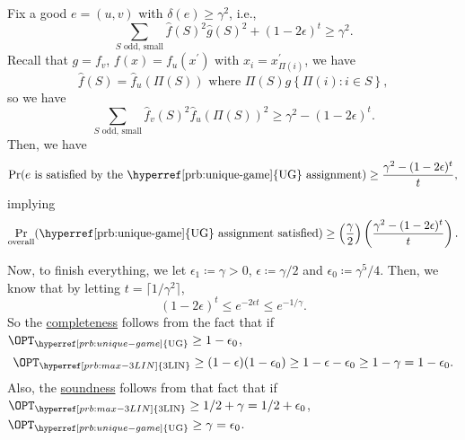 Fix a good \(e=(u, v)\) with \(\delta (e) \geq \gamma ^{2}\), i.e.,
\[
	\sum_{\text{\(S\) odd, small}} \hat{f} (S)^{2} \hat{g} (S)^{2} + (1-2\epsilon )^t \geq \gamma ^2.
\]
Recall that \(g = f_v\), \(f(x) = f_u(x^\prime )\) with \(x_i = x^\prime _{\Pi (i)}\), we have
\[
	\hat{f} (S) = \hat{f} _u(\Pi (S)) \text{ where } \Pi (S) g \left\{ \Pi (i)\colon i\in S \right\},
\]
so we have
\[
	\sum_{\text{\(S\) odd, small}} \hat{f} _v(S)^{2} \hat{f} _u(\Pi (S))^2 \geq \gamma ^2 - (1-2\epsilon )^t.
\]
Then, we have
\[
	\Pr_{}(e \text{ is satisfied by the \hyperref[prb:unique-game]{UG} assignment} )  \geq \frac{\gamma ^2 - (1 - 2\epsilon )^t}{t},
\]
implying
\[
	\Pr_{\text{overall}}(\text{\hyperref[prb:unique-game]{UG} assignment satisfied}) \geq \left( \frac{\gamma}{2} \right) \left( \frac{\gamma ^{2} - (1 - 2\epsilon )^t}{t} \right).
\]

Now, to finish everything, we let \(\epsilon _1 \coloneqq \gamma > 0\), \(\epsilon \coloneqq \gamma / 2\) and \(\epsilon _0 \coloneqq \gamma ^5 / 4\). Then, we know that by letting \(t = \lceil 1 / \gamma ^2 \rceil \),
\[
	(1 - 2\epsilon )^t \leq e^{-2 \epsilon t} \leq e^{- 1 / \gamma }.
\]
So the \hyperref[def:completeness]{completeness} follows from the fact that if \(\OPT_{\hyperref[prb:unique-game]{\text{UG}}}\geq 1 - \epsilon _0\),
\[
	\OPT_{\hyperref[prb:max-3LIN]{\text{3LIN} } }
	\geq (1 - \epsilon )(1 - \epsilon _0)
	\geq 1 - \epsilon - \epsilon _0
	\geq 1 - \gamma
	= 1 - \epsilon _0.
\]
Also, the \hyperref[def:soundness]{soundness} follows from that fact that if \(\OPT_{\hyperref[prb:max-3LIN]{\text{3LIN} } }\geq 1 / 2 + \gamma = 1 / 2 + \epsilon _0\), \(\OPT_{\hyperref[prb:unique-game]{\text{UG}}} \geq \gamma  = \epsilon _0\).